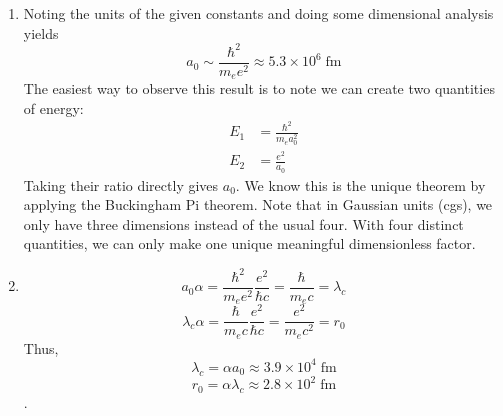 \begin{sol}
\begin{enumerate}[label=\textbf{(\alph*)}]
\item Noting the units of the given constants and doing some dimensional analysis yields $$a_0 \sim \frac{\hbar^2}{m_ee^2} \approx 5.3 \times 10^{6}\;\mathrm{fm}$$
The easiest way to observe this result is to note we can create two quantities of energy:
\begin{align*}
    E_1 &= \frac{\hbar^2}{m_ea_0^2} \\
    E_2 &= \frac{e^2}{a_0}
\end{align*}
Taking their ratio directly gives $a_0$. We know this is the unique theorem by applying the Buckingham Pi theorem. Note that in Gaussian units (cgs), we only have three dimensions instead of the usual four. With four distinct quantities, we can only make one unique meaningful dimensionless factor.
\item $$a_0\alpha = \frac{\hbar^2}{m_ee^2}\frac{e^2}{\hbar c} = \frac{\hbar}{m_ec} = \lambda_c$$ $$\lambda_c\alpha = \frac{\hbar}{m_ec}\frac{e^2}{\hbar c} = \frac{e^2}{m_ec^2} = r_0$$ Thus, $$\lambda_c = \alpha a_0 \approx 3.9 \times 10^4\;\mathrm{fm}$$ 
$$r_0 = \alpha \lambda_c \approx 2.8 \times 10^2\;\mathrm{fm}$$.
\end{enumerate}
\end{sol}